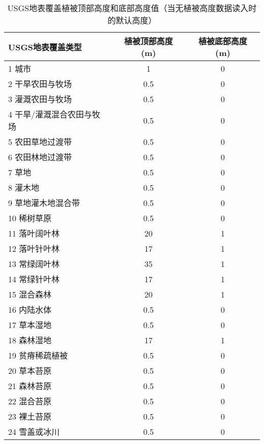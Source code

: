 \begin{table}[htbp]
  \centering
  \caption[USGS地表覆盖植被顶部高度和底部高度值]{USGS地表覆盖植被顶部高度和底部高度值（当无植被高度数据读入时的默认高度）}
  \label{tab:USGS地表覆盖植被顶部高度和底部高度值}
  \begin{tabular}{@{}lcc@{}}
    \toprule
    USGS地表覆盖类型          & 植被顶部高度 (m) & 植被底部高度 (m) \\ \midrule
    1 城市                    & 1                & 0                \\
    2 干旱农田与牧场          & 0.5              & 0                \\
    3 灌溉农田与牧场          & 0.5              & 0                \\
    4 干旱/灌溉混合农田与牧场 & 0.5              & 0                \\
    5 农田草地过渡带          & 0.5              & 0                \\
    6 农田林地过渡带          & 0.5              & 0                \\
    7 草地                    & 0.5              & 0                \\
    8 灌木地                  & 0.5              & 0                \\
    9 草地灌木地混合带        & 0.5              & 0                \\
    10 稀树草原               & 0.5              & 0                \\
    11 落叶阔叶林             & 20               & 1                \\
    12 落叶针叶林             & 17               & 1                \\
    13 常绿阔叶林             & 35               & 1                \\
    14 常绿针叶林             & 17               & 1                \\
    15 混合森林               & 20               & 1                \\
    16 内陆水体               & 0.5              & 0                \\
    17 草本湿地               & 0.5              & 0                \\
    18 森林湿地               & 17               & 1                \\
    19 贫瘠稀疏植被           & 0.5              & 0                \\
    20 草本苔原               & 0.5              & 0                \\
    21 森林苔原               & 0.5              & 0                \\
    22 混合苔原               & 0.5              & 0                \\
    23 裸土苔原               & 0.5              & 0                \\
    24 雪盖或冰川             & 0.5              & 0                \\ \bottomrule
  \end{tabular}
\end{table}

